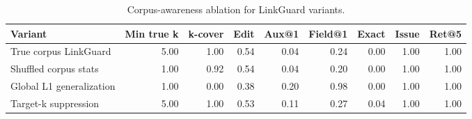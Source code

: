 \begin{table}[t]
\centering
\scriptsize
\setlength{\tabcolsep}{3pt}
\caption{Corpus-awareness ablation for LinkGuard variants.}
\label{tab:corpus_awareness_ablation}
\begin{tabular}{lrrrrrrrr}
\toprule
Variant & Min true k & k-cover & Edit & Aux@1 & Field@1 & Exact & Issue & Ret@5 \\
\midrule
True corpus LinkGuard & 5.00 & 1.00 & 0.54 & 0.04 & 0.24 & 0.00 & 1.00 & 1.00 \\
Shuffled corpus stats & 1.00 & 0.92 & 0.54 & 0.04 & 0.20 & 0.00 & 1.00 & 1.00 \\
Global L1 generalization & 1.00 & 0.00 & 0.38 & 0.20 & 0.98 & 0.00 & 1.00 & 1.00 \\
Target-k suppression & 5.00 & 1.00 & 0.53 & 0.11 & 0.27 & 0.04 & 1.00 & 1.00 \\
\bottomrule
\end{tabular}
\end{table}
